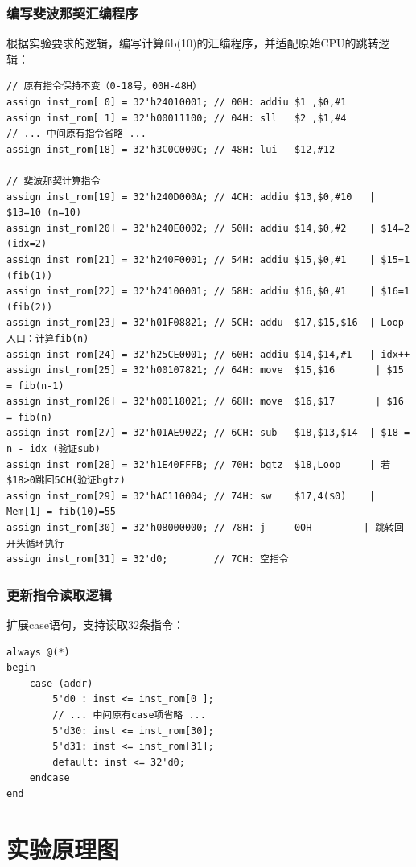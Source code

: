 \documentclass[12pt,a4paper]{article}
\begin{document}
\subsubsection{编写斐波那契汇编程序}
根据实验要求的逻辑，编写计算fib(10)的汇编程序，并适配原始CPU的跳转逻辑：
\begin{lstlisting}
// 原有指令保持不变（0-18号，00H-48H）
assign inst_rom[ 0] = 32'h24010001; // 00H: addiu $1 ,$0,#1
assign inst_rom[ 1] = 32'h00011100; // 04H: sll   $2 ,$1,#4
// ... 中间原有指令省略 ...
assign inst_rom[18] = 32'h3C0C000C; // 48H: lui   $12,#12

// 斐波那契计算指令
assign inst_rom[19] = 32'h240D000A; // 4CH: addiu $13,$0,#10   | $13=10 (n=10)
assign inst_rom[20] = 32'h240E0002; // 50H: addiu $14,$0,#2    | $14=2 (idx=2)
assign inst_rom[21] = 32'h240F0001; // 54H: addiu $15,$0,#1    | $15=1 (fib(1))
assign inst_rom[22] = 32'h24100001; // 58H: addiu $16,$0,#1    | $16=1 (fib(2))
assign inst_rom[23] = 32'h01F08821; // 5CH: addu  $17,$15,$16  | Loop入口：计算fib(n)
assign inst_rom[24] = 32'h25CE0001; // 60H: addiu $14,$14,#1   | idx++
assign inst_rom[25] = 32'h00107821; // 64H: move  $15,$16       | $15 = fib(n-1)
assign inst_rom[26] = 32'h00118021; // 68H: move  $16,$17       | $16 = fib(n)
assign inst_rom[27] = 32'h01AE9022; // 6CH: sub   $18,$13,$14  | $18 = n - idx (验证sub)
assign inst_rom[28] = 32'h1E40FFFB; // 70H: bgtz  $18,Loop     | 若$18>0跳回5CH(验证bgtz)
assign inst_rom[29] = 32'hAC110004; // 74H: sw    $17,4($0)    | Mem[1] = fib(10)=55
assign inst_rom[30] = 32'h08000000; // 78H: j     00H         | 跳转回开头循环执行
assign inst_rom[31] = 32'd0;        // 7CH: 空指令
\end{lstlisting}

\subsubsection{更新指令读取逻辑}
扩展case语句，支持读取32条指令：
\begin{lstlisting}
always @(*)
begin
    case (addr)
        5'd0 : inst <= inst_rom[0 ];
        // ... 中间原有case项省略 ...
        5'd30: inst <= inst_rom[30];
        5'd31: inst <= inst_rom[31];
        default: inst <= 32'd0;
    endcase
end
\end{lstlisting}

\section{实验原理图}
\end{document}
